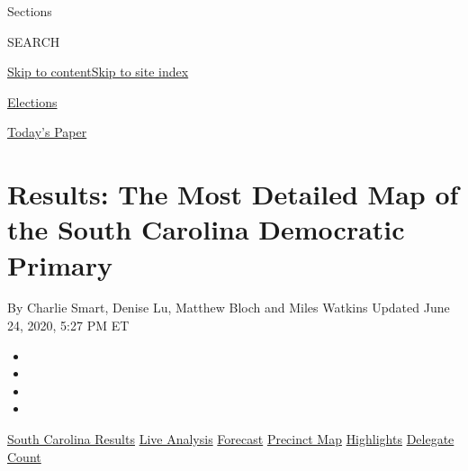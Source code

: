 Sections

SEARCH

\protect\hyperlink{site-content}{Skip to
content}\protect\hyperlink{site-index}{Skip to site index}

\href{https://www.nytimes3xbfgragh.onion/news-event/2020-election}{Elections}

\href{https://myaccount.nytimes3xbfgragh.onion/auth/login?response_type=cookie\&client_id=vi}{}

\href{https://www.nytimes3xbfgragh.onion/section/todayspaper}{Today's
Paper}

\hypertarget{results-the-most-detailed-map-of-the-south-carolina-democratic-primary}{%
\section{Results: The Most Detailed Map of the South Carolina Democratic
Primary}\label{results-the-most-detailed-map-of-the-south-carolina-democratic-primary}}

By Charlie Smart, Denise Lu, Matthew Bloch and Miles Watkins Updated
June 24, 2020, 5:27 PM ET

\begin{itemize}
\item
\item
\item
\item
\end{itemize}

\href{https://www.nytimes3xbfgragh.onion/interactive/2020/02/29/us/elections/results-south-carolina-primary-election.html?action=click\&module=ELEX_results\&pgtype=Interactive\&region=Navigation}{South
Carolina Results}
\href{https://www.nytimes3xbfgragh.onion/interactive/2020/02/29/us/elections/results-south-carolina-live-updates.html?action=click\&module=ELEX_results\&pgtype=Interactive\&region=Navigation}{Live
Analysis}
\href{https://www.nytimes3xbfgragh.onion/interactive/2020/02/29/us/elections/results-south-carolina-live-forecast.html?action=click\&module=ELEX_results\&pgtype=Interactive\&region=Navigation}{Forecast}
\href{https://www.nytimes3xbfgragh.onion/interactive/2020/02/29/us/elections/results-south-carolina-primary-precinct-map.html?action=click\&module=ELEX_results\&pgtype=Interactive\&region=Navigation}{Precinct
Map}
\href{https://www.nytimes3xbfgragh.onion/live/2020/south-carolina-2020-democratic-primary-03-01?action=click\&module=ELEX_results\&pgtype=Interactive\&region=Navigation}{Highlights}
\href{https://www.nytimes3xbfgragh.onion/interactive/2020/us/elections/delegate-count-primary-results.html?action=click\&module=ELEX_results\&pgtype=Interactive\&region=Navigation}{Delegate
Count}

